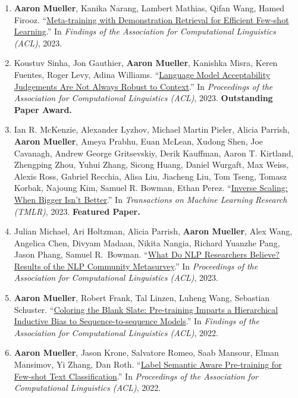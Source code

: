 \documentclass[10pt]{article}
\providecommand*\titlelink[2]{\href{#1}{\textcolor{accent}{#2}}}
\begin{document}
\begin{enumerate}[leftmargin=*, topsep=0pt, itemsep=0.25ex, partopsep=0ex, parsep=1ex]
	\item \textbf{Aaron Mueller}, Kanika Narang, Lambert Mathias, Qifan Wang, Hamed Firooz. ``\titlelink{https://arxiv.org/abs/2307.00119}{Meta-training with Demonstration Retrieval for Efficient Few-shot Learning}.'' In \textit{Findings of the Association for Computational Linguistics (ACL)}, 2023.\label{pub:metalearn}
	
	\item Koustuv Sinha, Jon Gauthier, \textbf{Aaron Mueller}, Kanishka Misra, Keren Fuentes, Roger Levy, Adina Williams. ``\titlelink{https://arxiv.org/abs/2212.08979}{Language Model Acceptability Judgements Are Not Always Robust to Context}.'' In \emph{Proceedings of the Association for Computational Linguistics (ACL)}, 2023. \textbf{\textcolor{accent}{Outstanding Paper Award.}}
	
	\item Ian R. McKenzie, Alexander Lyzhov, Michael Martin Pieler, Alicia Parrish, \textbf{Aaron Mueller}, Ameya Prabhu, Euan McLean, Xudong Shen, Joe Cavanagh, Andrew George Gritsevskiy, Derik Kauffman, Aaron T. Kirtland, Zhengping Zhou, Yuhui Zhang, Sicong Huang, Daniel Wurgaft, Max Weiss, Alexis Ross, Gabriel Recchia, Alisa Liu, Jiacheng Liu, Tom Tseng, Tomasz Korbak, Najoung Kim, Samuel R. Bowman, Ethan Perez. ``\titlelink{https://arxiv.org/abs/2306.09479}{Inverse Scaling: When Bigger Isn't Better}.'' In \emph{Transactions on Machine Learning Research (TMLR)}, 2023. \textbf{\textcolor{accent}{Featured Paper.}}

	\item Julian Michael, Ari Holtzman, Alicia Parrish, \textbf{Aaron Mueller}, Alex Wang, Angelica Chen, Divyam Madaan, Nikita Nangia, Richard Yuanzhe Pang, Jason Phang, Samuel R.\ Bowman. ``\titlelink{https://arxiv.org/abs/2208.12852}{What Do NLP Researchers Believe? Results of the NLP Community Metasurvey}.'' In \emph{Proceedings of the Association for Computational Linguistics (ACL)}, 2023.
	
	\item \textbf{Aaron Mueller}, Robert Frank, Tal Linzen, Luheng Wang, Sebastian Schuster. ``\titlelink{https://aclanthology.org/2022.findings-acl.106.pdf}{Coloring the Blank Slate: Pre-training Imparts a Hierarchical Inductive Bias to Sequence-to-sequence Models}.'' In \emph{Findings of the Association for Computational Linguistics (ACL)}, 2022.

	\item \textbf{Aaron Mueller}, Jason Krone, Salvatore Romeo, Saab Mansour, Elman Mansimov, Yi Zhang, Dan Roth. ``\titlelink{https://aclanthology.org/2022.acl-long.570/}{Label Semantic Aware Pre-training for Few-shot Text Classification}.'' In \emph{Proceedings of the Association for Computational Linguistics (ACL)}, 2022.\label{pub:lsap}
	

\end{enumerate}
\end{document}
